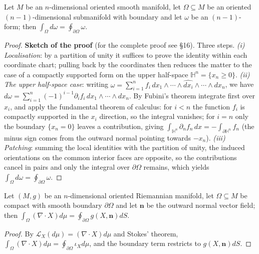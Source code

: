 \begin{theorem}\label{thm:stokes_manifold}
Let $M$ be an $n$-dimensional oriented smooth manifold, let $\Omega\subseteq M$ be an oriented $(n-1)$-dimensional submanifold with boundary and let $\omega$ be an $(n-1)$-form; then $\int_\Omega d\omega=\oint_{\partial\Omega}\omega$.
\end{theorem}

\begin{proof}
\textbf{Sketch of the proof} (for the complete proof see \cite{lee2012smooth} \S{}16). Three steps. \emph{(i) Localisation}: by a partition of unity it suffices to prove the identity within each coordinate chart; pulling back by the coordinates then reduces the matter to the case of a compactly supported form on the upper half-space $\mathbb{H}^n=\{x_n\ge0\}$. \emph{(ii) The upper half-space case}: writing $\omega=\sum_{i=1}^{n}f_i\,dx_1\wedge\cdots\wedge\widehat{dx_i}\wedge\cdots\wedge dx_n$, we have $d\omega=\sum_{i=1}^{n}(-1)^{i-1}\partial_i f_i\,dx_1\wedge\cdots\wedge dx_n$. By Fubini's theorem integrate first over $x_i$, and apply the fundamental theorem of calculus: for $i<n$ the function $f_i$ is compactly supported in the $x_i$ direction, so the integral vanishes; for $i=n$ only the boundary $\{x_n=0\}$ leaves a contribution, giving $\int_{\mathbb{H}^n}\partial_n f_n\,dx=-\int_{\partial\mathbb{H}^n}f_n$ (the minus sign comes from the outward normal pointing towards $-x_n$). \emph{(iii) Patching}: summing the local identities with the partition of unity, the induced orientations on the common interior faces are opposite, so the contributions cancel in pairs and only the integral over $\partial\Omega$ remains, which yields $\int_\Omega d\omega=\oint_{\partial\Omega}\omega$.
\end{proof}

\begin{theorem}\label{thm:gauss_divergence_manifold}
Let $(M,g)$ be an $n$-dimensional oriented Riemannian manifold, let $\Omega\subseteq M$ be compact with smooth boundary $\partial\Omega$ and let $\mathbf{n}$ be the outward normal vector field; then $\int_\Omega(\nabla\cdot X)d\mu=\oint_{\partial\Omega}g(X,\mathbf{n})dS$.
\end{theorem}

\begin{proof}
By $\mathcal{L}_X(d\mu)=(\nabla\cdot X)d\mu$ and Stokes' theorem, $\int_\Omega(\nabla\cdot X)d\mu=\oint_{\partial\Omega}\iota_Xd\mu$, and the boundary term restricts to $g(X,\mathbf{n})dS$.
\end{proof}


